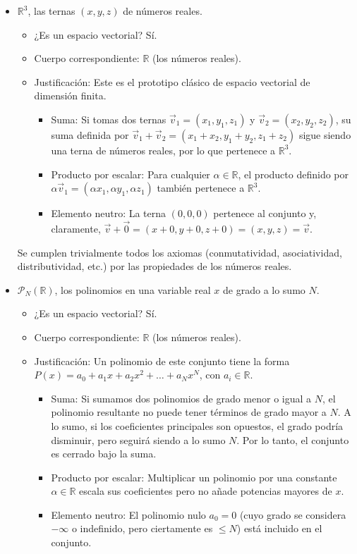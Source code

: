 \documentclass[11pt,spanish]{article}
\begin{document}
\begin{itemize}
\item[$a)$] $\mathbb{R}^3$, las ternas $(x,y,z)$ de números reales.

\begin{itemize}
\item ¿Es un espacio vectorial? Sí.
\item Cuerpo correspondiente: $\mathbb{R}$ (los números reales).
\item Justificación: Este es el prototipo clásico de espacio vectorial de dimensión finita.
\begin{itemize}
\item Suma: Si tomas dos ternas $\vec{v}_1 = (x_1, y_1, z_1)$ y $\vec{v}_2 = (x_2, y_2, z_2)$, su suma definida por $\vec{v}_1+\vec{v}_2=(x_1+x_2, y_1+y_2, z_1+z_2)$ sigue siendo una terna de números reales, por lo que pertenece a $\mathbb{R}^3$.
\item Producto por escalar: Para cualquier $\alpha \in \mathbb{R}$, el producto definido por $\alpha\vec{v}_1 = (\alpha x_1, \alpha y_1, \alpha z_1)$ también pertenece a $\mathbb{R}^3$.
\item Elemento neutro: La terna $(0,0,0)$ pertenece al conjunto y, claramente, $\vec{v}+\vec{0}=(x+0,y+0,z+0)=(x,y,z)=\vec{v}$.
\end{itemize}
\end{itemize}
Se cumplen trivialmente todos los axiomas (conmutatividad, asociatividad, distributividad, etc.) por las propiedades de los números reales.

\item[$b)$] $\mathcal{P}_N(\mathbb{R})$, los polinomios en una variable real $x$ de grado a lo sumo $N$.

\begin{itemize}
\item ¿Es un espacio vectorial? Sí.
\item Cuerpo correspondiente: $\mathbb{R}$ (los números reales).
\item Justificación: Un polinomio de este conjunto tiene la forma $P(x) = a_0 + a_1 x + a_2 x^2 + \dots + a_N x^N$, con $a_i \in \mathbb{R}$.
\begin{itemize}
\item Suma: Si sumamos dos polinomios de grado menor o igual a $N$, el polinomio resultante no puede tener términos de grado mayor a $N$. A lo sumo, si los coeficientes principales son opuestos, el grado podría disminuir, pero seguirá siendo a lo sumo $N$. Por lo tanto, el conjunto es cerrado bajo la suma.
\item Producto por escalar: Multiplicar un polinomio por una constante $\alpha \in \mathbb{R}$ escala sus coeficientes pero no añade potencias mayores de $x$.
\item Elemento neutro: El polinomio nulo $a_0=0$ (cuyo grado se considera $-\infty$ o indefinido, pero ciertamente es $\le N$) está incluido en el conjunto.
\end{itemize}
\end{itemize}


\end{itemize}
\end{document}
